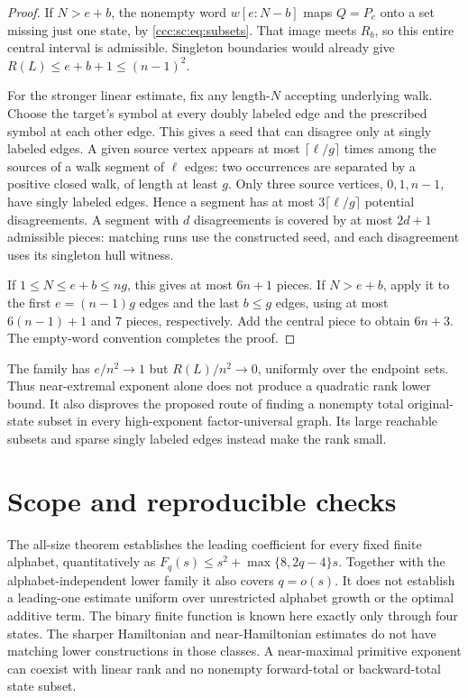 \documentclass[11pt,letterpaper]{article}
\theoremstyle{definition}
\theoremstyle{remark}
\begin{document}
\begin{proof}
If $N>e+b$, the nonempty word $w[e:N-b]$ maps $Q=P_e$ onto a set missing just one state, by \eqref{ccc:sc:eq:subsets}. That image meets $R_b$, so this entire central interval is admissible. Singleton boundaries would already give $R(L)\le e+b+1\le(n-1)^2$.

For the stronger linear estimate, fix any length-$N$ accepting underlying walk. Choose the target's symbol at every doubly labeled edge and the prescribed symbol at each other edge. This gives a seed that can disagree only at singly labeled edges. A given source vertex appears at most $\lceil\ell/g\rceil$ times among the sources of a walk segment of $\ell$ edges: two occurrences are separated by a positive closed walk, of length at least $g$. Only three source vertices, $0,1,n-1$, have singly labeled edges. Hence a segment has at most $3\lceil\ell/g\rceil$ potential disagreements. A segment with $d$ disagreements is covered by at most $2d+1$ admissible pieces: matching runs use the constructed seed, and each disagreement uses its singleton hull witness.

If $1\le N\le e+b\le ng$, this gives at most $6n+1$ pieces. If $N>e+b$, apply it to the first $e=(n-1)g$ edges and the last $b\le g$ edges, using at most $6(n-1)+1$ and $7$ pieces, respectively. Add the central piece to obtain $6n+3$. The empty-word convention completes the proof.
\end{proof}

The family has $e/n^2\to1$ but $R(L)/n^2\to0$, uniformly over the endpoint sets. Thus near-extremal exponent alone does not produce a quadratic rank lower bound. It also disproves the proposed route of finding a nonempty total original-state subset in every high-exponent factor-universal graph. Its large reachable subsets and sparse singly labeled edges instead make the rank small.

\section{Scope and reproducible checks}\label{ccc:sc:sec:scope}

The all-size theorem establishes the leading coefficient for every fixed finite alphabet, quantitatively as $F_q(s)\le s^2+\max\{8,2q-4\}s$. Together with the alphabet-independent lower family it also covers $q=o(s)$. It does not establish a leading-one estimate uniform over unrestricted alphabet growth or the optimal additive term. The binary finite function is known here exactly only through four states. The sharper Hamiltonian and near-Hamiltonian estimates do not have matching lower constructions in those classes. A near-maximal primitive exponent can coexist with linear rank and no nonempty forward-total or backward-total state subset.
\end{document}
